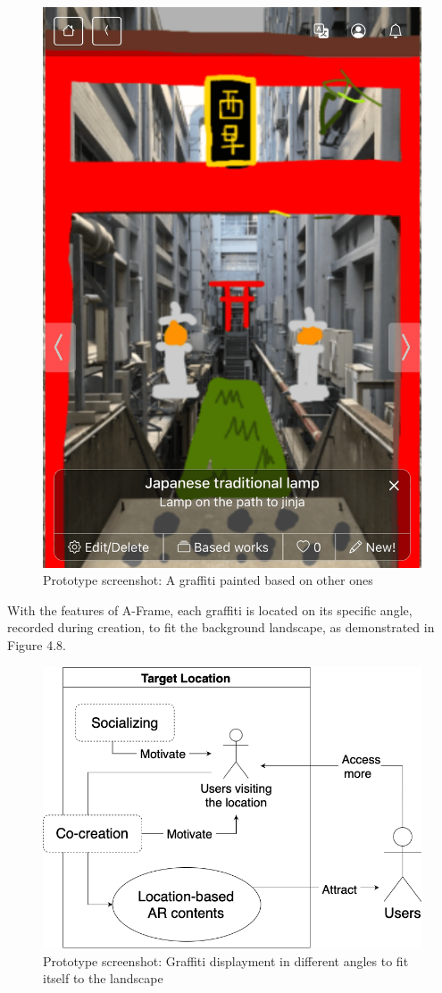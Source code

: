 \begin{figure}
\begin{minipage}{0.48\textwidth}
    \includegraphics[width=0.9\linewidth]{resources/4_methodology/prototype_based_graffiti.png}
      \caption{Prototype screenshot: A graffiti painted based on other ones}
  \end{minipage}
\end{figure}

With the features of A-Frame, each graffiti is located on its specific angle, recorded during creation, to fit the background landscape, as demonstrated in Figure 4.8.

\begin{figure}
  \centering
  \includegraphics[width=0.8\columnwidth]{resources/4_methodology/revitalization_with_AR_and_cocreation.png}
    \caption{Prototype screenshot: Graffiti displayment in different angles to fit itself to the landscape}
\end{figure}

